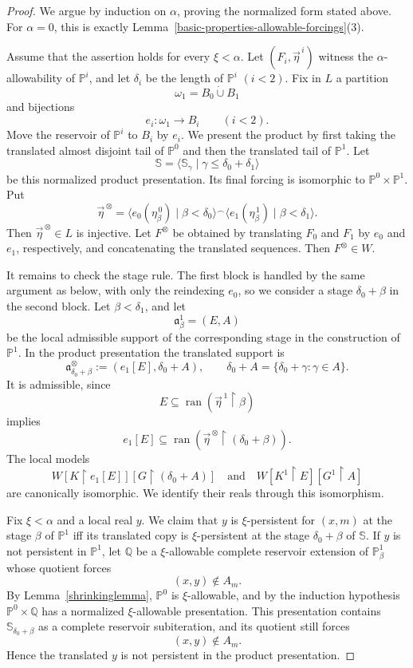 \documentclass[10pt,a4paper]{amsart}
\newcommand{\forceP}{\mathbb{P}}
\newcommand{\forceQ}{\mathbb{Q}}
\newcommand{\forceS}{\mathbb{S}}
\begin{document}
\begin{proof}
We argue by induction on $\alpha$, proving the normalized form stated above.
For $\alpha=0$, this is exactly
Lemma~\ref{basic-properties-allowable-forcings}(3).

Assume that the assertion holds for every $\xi<\alpha$.  Let
$(F_i,\vec\eta^{\,i})$ witness the $\alpha$-allowability of
$\forceP^i$, and let $\delta_i$ be the length of $\forceP^i$
$(i<2)$.  Fix in $L$ a partition
\[
   \omega_1=B_0\mathbin{\dot\cup}B_1
\]
and bijections
\[
   e_i:\omega_1\longrightarrow B_i
   \qquad(i<2).
\]
Move the reservoir of $\forceP^i$ to $B_i$ by $e_i$.  We present the product
by first taking the translated almost disjoint tail of $\forceP^0$ and then
the translated tail of $\forceP^1$.  Let
\[
   \forceS=\langle\forceS_\gamma\mid
      \gamma\leq\delta_0+\delta_1\rangle
\]
be this normalized product presentation.  Its final forcing is isomorphic to
$\forceP^0\times\forceP^1$.  Put
\[
   \vec\eta^{\,\otimes}
   =
   \langle e_0(\eta^{\,0}_\beta)\mid\beta<\delta_0\rangle
    {}^\frown
    \langle e_1(\eta^{\,1}_\beta)\mid\beta<\delta_1\rangle.
\]
Then $\vec\eta^{\,\otimes}\in L$ is injective.  Let
$F^\otimes$ be obtained by translating $F_0$ and $F_1$ by $e_0$ and
$e_1$, respectively, and concatenating the translated sequences.  Then
$F^\otimes\in W$.

It remains to check the stage rule.  The first block is handled by the same
argument as below, with only the reindexing $e_0$, so we consider a stage
$\delta_0+\beta$ in the second block.  Let $\beta<\delta_1$, and let
\[
   \mathfrak a^1_\beta=(E,A)
\]
be the local admissible support of the corresponding stage in the construction
of $\forceP^1$.  In the product presentation the translated support is
\[
   \mathfrak a^\otimes_{\delta_0+\beta}
   :=(e_1[E],\delta_0+A),
   \qquad
   \delta_0+A=\{\delta_0+\gamma:\gamma\in A\}.
\]
It is admissible, since
\[
   E\subseteq
   \operatorname{ran}(\vec\eta^{\,1}\upharpoonright\beta)
\]
implies
\[
   e_1[E]\subseteq
   \operatorname{ran}
      (\vec\eta^{\,\otimes}\upharpoonright(\delta_0+\beta)).
\]
The local models
\[
   W[K\upharpoonright e_1[E]]
    [G\upharpoonright(\delta_0+A)]
   \quad\text{and}\quad
   W[K^1\upharpoonright E][G^1\upharpoonright A]
\]
are canonically isomorphic.  We identify their reals through this isomorphism.

Fix $\xi<\alpha$ and a local real $y$.  We claim that $y$ is
$\xi$-persistent for $(x,m)$ at the stage $\beta$ of $\forceP^1$ iff its
translated copy is $\xi$-persistent at the stage $\delta_0+\beta$ of
$\forceS$.  If $y$ is not persistent in $\forceP^1$, let $\forceQ$ be a
$\xi$-allowable complete reservoir extension of $\forceP^1_\beta$ whose
quotient forces
\[
   (x,y)\notin A_m.
\]
By Lemma~\ref{shrinkinglemma}, $\forceP^0$ is $\xi$-allowable, and by the
induction hypothesis $\forceP^0\times\forceQ$ has a normalized
$\xi$-allowable presentation.  This presentation contains
$\forceS_{\delta_0+\beta}$ as a complete reservoir subiteration, and its
quotient still forces
\[
   (x,y)\notin A_m.
\]
Hence the translated $y$ is not persistent in the product presentation.


\end{proof}
\end{document}
